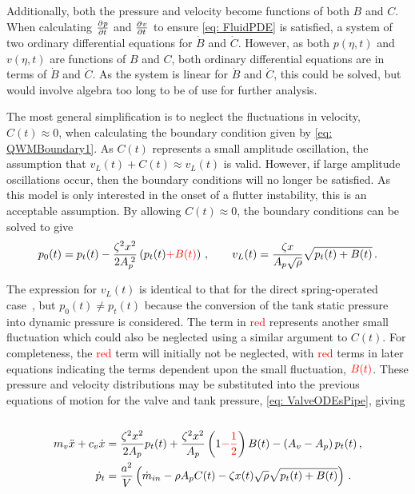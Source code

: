 Additionally, both the pressure and velocity become functions of both $B$ and $C$. When calculating $\pdiff{p}{t}$ and $\pdiff{v}{t}$ to ensure \cref{eq: FluidPDE} is satisfied, a system of two ordinary differential equations for $\dot{B}$ and $\dot{C}$. However, as both $p(\eta,t)$ and $v(\eta,t)$ are functions of $B$ and $C$, both ordinary differential equations are in terms of $\dot{B}$ and $\dot{C}$. As the system is linear for $\dot{B}$ and $\dot{C}$, this could be solved, but would involve algebra too long to be of use for further analysis.

The most general simplification is to neglect the fluctuations in velocity, $C(t) \approx 0$, when calculating the boundary condition given by \cref{eq: QWMBoundary1}. As $C(t)$ represents a small amplitude oscillation, the assumption that $v_L(t) + C(t) \approx v_L(t)$ is valid. However, if large amplitude oscillations occur, then the boundary conditions will no longer be satisfied. As this model is only interested in the onset of a flutter instability, this is an acceptable assumption. By allowing $C(t) \approx 0$, the boundary conditions can be solved to give
~
\begin{equation} \label{eq: QWMPresAndVelBound}
    p_0(t) = p_t(t) - \frac{\zeta^2 x^2}{2 A_p\power{2}} \left( p_t(t) \textcolor{Red}{+ B(t)} \right)
    \, , \qquad
    v_L(t) = \frac{\zeta x}{A_p \sqrt{\rho}} \sqrt{p_t(t) + B(t)} \, .
\end{equation}

The expression for $v_L(t)$ is identical to that for the direct spring-operated case~\cite{Hos2015ModelPipe}, but $p_0(t) \neq p_t(t)$ because the conversion of the tank static pressure into dynamic pressure is considered. The term in \textcolor{Red}{red} represents another small fluctuation which could also be neglected using a similar argument to $C(t)$. For completeness, the \textcolor{Red}{red} term will initially not be neglected, with \textcolor{Red}{red} terms in later equations indicating the terms dependent upon the small fluctuation, $\textcolor{Red}{B(t)}$. These pressure and velocity distributions may be substituted into the previous equations of motion for the valve and tank pressure, \cref{eq: ValveODEsPipe}, giving
~
\begin{equation*}
\begin{split}
    m_v \ddot{x} + c_v \dot{x} &= \frac{\zeta^2 x^2}{2 A_p} p_t(t) + \frac{\zeta^2 x^2}{A_p} \left( 1 \textcolor{Red}{- \frac{1}{2}} \right) B(t) - \left( A_v - A_p \right) p_t(t)
    \, , \\
    \dot{p}_t &= \frac{a^2}{V} \left( \dot{m}_{in} - \rho A_p C(t) - \zeta x(t) \sqrt{\rho} \sqrt{p_t(t) + B(t)} \right) \, .
\end{split}
\end{equation*}

